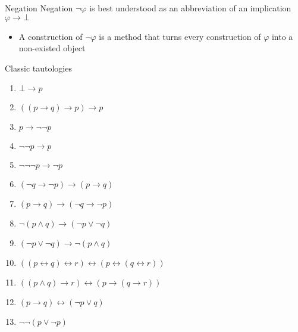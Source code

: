 \documentclass[sans]{beamer}
\begin{document}
\begin{frame}{Negation}
  Negation $\lnot \varphi$ is best understood as an abbreviation of an implication $\varphi \to \bot$

  \begin{itemize}
    \item A construction of $\lnot \varphi$ is a method that turns every construction of
      $\varphi$ into a non-existed object
  \end{itemize}
\end{frame}

\begin{frame}{Classic tautologies}
   \begin{enumerate}
     \item $\bot \to p$
     \item $((p \to q) \to p) \to p$
     \item $p \to \lnot \lnot p$
     \item $\lnot \lnot p \to p$
     \item $\lnot \lnot \lnot p \to \lnot p$
     \item $(\lnot q \to \lnot p) \to (p \to q)$
     \item $(p \to q) \to (\lnot q \to \lnot p)$
     \item $\lnot (p \wedge q) \to (\lnot p \vee \lnot q)$
     \item $(\lnot p \vee \lnot q) \to \lnot (p \wedge q)$
     \item $((p \leftrightarrow q) \leftrightarrow r) \leftrightarrow (p \leftrightarrow (q \leftrightarrow r))$
     \item $((p \wedge q) \to r) \leftrightarrow (p \to (q \to r))$
     \item $(p \to q) \leftrightarrow (\lnot p \vee q)$
     \item $\lnot\lnot (p \vee \lnot p)$
   \end{enumerate}
\end{frame}
\end{document}
